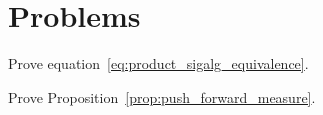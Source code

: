 \section{Problems}

\begin{problem}\label{prb:product_sigalg_equivalence}
Prove equation~\eqref{eq:product_sigalg_equivalence}.
\end{problem}

\begin{problem}\label{prb:push_forward_measure}
Prove Proposition~\ref{prop:push_forward_measure}.
\end{problem}
